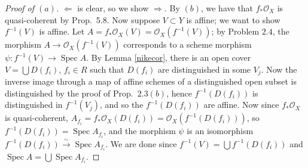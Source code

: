 \documentclass[12pt,letterpaper]{article}
\newtheorem{proposition}{Proposition}
\theoremstyle{definition}
\newtheorem*{definition}{Definition}
\theoremstyle{remark}
\numberwithin{equation}{section}
\numberwithin{figure}{problem}
\DeclareMathOperator{\Spec}{Spec}
\DeclareMathOperator{\SPEC}{\mathbf{Spec}}
\DeclareMathOperator{\Hom}{Hom}
\newcommand{\OO}{\mathcal{O}}
\newcommand{\Af}{\mathfrak{A}}
\newcommand{\Aa}{\mathscr{A}}
\newcommand{\Sch}{\mathfrak{Sch}}
\newcommand{\isoto}{\overset{\sim}{\to}}
\newcommand{\Alg}{\mathsf{Alg}\mathchar`-}
\begin{document}
\begin{proof}[Proof of $(a)$]
  $\Leftarrow$ is clear, so we show $\Rightarrow$. By $(b)$, we have that $f_*\OO_X$ is quasi-coherent by Prop.~5.8. Now suppose $V \subset Y$ is affine; we want to show $f^{-1}(V)$ is affine. Let $A = f_*\OO_X(V) = \OO_X(f^{-1}(V))$; by Problem $2.4$, the morphism $A \to \OO_X(f^{-1}(V))$ corresponds to a scheme morphism $\psi\colon f^{-1}(V) \to \Spec A$. By Lemma \ref{nikecor}, there is an open cover $V = \bigcup D(f_i)$, $f_i \in R$ such that $D(f_i)$ are distinguished in some $V_j$. Now the inverse image through a map of affine schemes of a distinguished open subset is distinguished by the proof of Prop.~$2.3(b)$, hence $f^{-1}(D(f_i))$ is distinguished in $f^{-1}(V_j)$, and so the $f^{-1}(D(f_i))$ are affine. Now since $f_*\OO_X$ is quasi-coherent, $A_{f_i} = f_*\OO_X(D(f_i)) = \OO_X(f^{-1}(D(f_i)))$, so $f^{-1}(D(f_i)) = \Spec A_{f_i}$, and the morphism $\psi$ is an isomorphism $f^{-1}(D(f_i)) \isoto \Spec A_{f_i}$. We are done since $f^{-1}(V) = \bigcup f^{-1}(D(f_i))$ and $\Spec A = \bigcup \Spec A_{f_i}$.
\end{proof}
\end{document}
